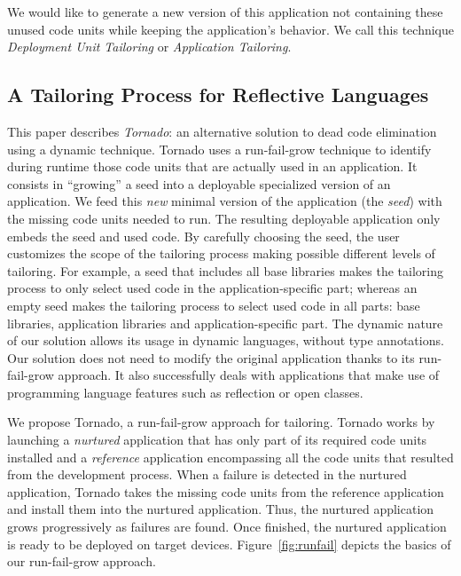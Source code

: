 We would like to generate a new version of this application not containing these unused code units while keeping the application's behavior. We call this technique \emph{Deployment Unit Tailoring} or \emph{Application Tailoring}.

\subsection{A Tailoring Process for Reflective Languages}

This paper describes \emph{Tornado}: an alternative solution to dead code elimination using a dynamic technique.
Tornado uses a run-fail-grow technique to identify during runtime those code units that are actually used in an application.
It consists in ``growing'' a seed into a deployable specialized version of an application. 
We feed this \emph{new} minimal version of the application (the \emph{seed}) with the missing code units needed to run.
The resulting deployable application only embeds the seed and used code.
By carefully choosing the seed, the user customizes the scope of the tailoring process making possible different levels of tailoring.
For example, a seed that includes all base libraries makes the tailoring process to only select used code in the application-specific part; whereas an empty seed makes the tailoring process to select used code in all parts: base libraries, application libraries and application-specific part.
The dynamic nature of our solution allows its usage in dynamic languages, without type annotations. Our solution does not need to modify the original application thanks to its run-fail-grow approach.
It also successfully deals with applications that make use of programming language features such as reflection or open classes.


We propose Tornado, a run-fail-grow approach for tailoring. Tornado works by launching a \emph{nurtured} application that has only part of its required code units installed and a \emph{reference} application encompassing all the code units that resulted from the development process. When a failure is detected in the nurtured application, Tornado takes the missing code units from the reference application and install them into the nurtured application. Thus, the nurtured application grows progressively as failures are found.
Once finished, the nurtured application is ready to be deployed on target devices. Figure~\ref{fig:runfail} depicts the basics of our run-fail-grow approach.

